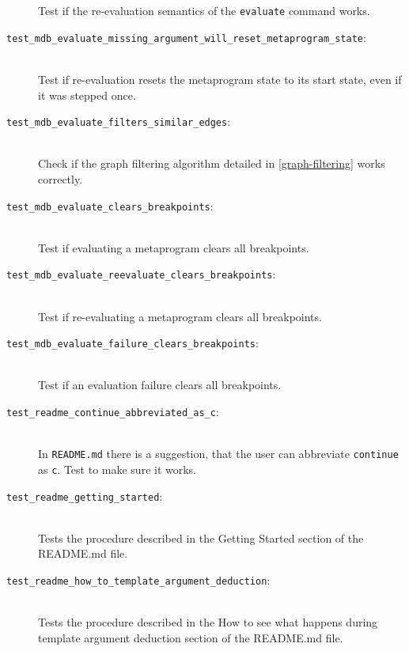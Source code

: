 \begin{description}
        Test if the re-evaluation semantics of the \texttt{evaluate} command
        works.
    \item[\texttt{test\_mdb\_evaluate\_missing\_argument\_will\_reset\_metaprogram\_state}:] \hfill \\
        Test if re-evaluation resets the metaprogram state to its start state,
        even if it was stepped once.
    \item[\texttt{test\_mdb\_evaluate\_filters\_similar\_edges}:] \hfill \\
        Check if the graph filtering algorithm detailed in
        \ref{graph-filtering} works correctly.
    \item[\texttt{test\_mdb\_evaluate\_clears\_breakpoints}:] \hfill \\
        Test if evaluating a metaprogram clears all breakpoints.
    \item[\texttt{test\_mdb\_evaluate\_reevaluate\_clears\_breakpoints}:] \hfill \\
        Test if re-evaluating a metaprogram clears all breakpoints.
    \item[\texttt{test\_mdb\_evaluate\_failure\_clears\_breakpoints}:] \hfill \\
        Test if an evaluation failure clears all breakpoints.
    \item[\texttt{test\_readme\_continue\_abbreviated\_as\_c}:] \hfill \\
        In \texttt{README.md} there is a suggestion, that the user can
        abbreviate \texttt{continue} as \texttt{c}. Test to make sure it works.
    \item[\texttt{test\_readme\_getting\_started}:] \hfill \\
        Tests the procedure described in the Getting Started section of the
        README.md file.
    \item[\texttt{test\_readme\_how\_to\_template\_argument\_deduction}:] \hfill \\
        Tests the procedure described in the How to see what happens during
        template argument deduction section of the README.md file.
\end{description}

